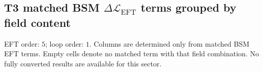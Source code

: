 \documentclass[8pt]{article}
\begin{document}
\begin{landscape}
\section*{T3 matched BSM $\Delta\mathcal{L}_{\mathrm{EFT}}$ terms grouped by field content}
EFT order: $5$; loop order: $1$. 
Columns are determined only from matched BSM EFT terms. Empty cells denote no matched term with that field combination.
\tiny
No fully converted results are available for this sector.
\end{landscape}
\end{document}
